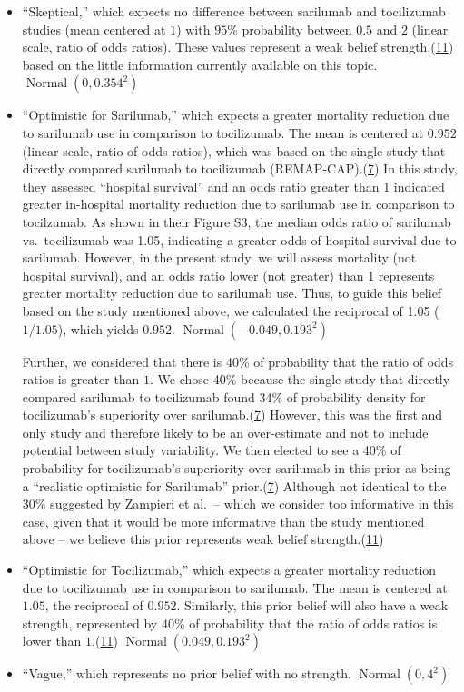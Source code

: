 \documentclass[
  12pt,
]{article}
\begin{document}
\begin{itemize}
\item
  ``Skeptical,'' which expects no difference between sarilumab and
  tocilizumab studies (mean centered at \(1\)) with \(95\%\) probability
  between \(0.5\) and \(2\) (linear scale, ratio of odds ratios). These
  values represent a weak belief
  strength,(\protect\hyperlink{ref-zampieri2021}{11}) based on the
  little information currently available on this topic.
  \(\operatorname{Normal}(0, 0.354^2)\)
\item
  ``Optimistic for Sarilumab,'' which expects a greater mortality
  reduction due to sarilumab use in comparison to tocilizumab. The mean
  is centered at \(0.952\) (linear scale, ratio of odds ratios), which
  was based on the single study that directly compared sarilumab to
  tocilizumab (REMAP-CAP).(\protect\hyperlink{ref-zotero-3144}{7}) In
  this study, they assessed ``hospital survival'' and an odds ratio
  greater than 1 indicated greater in-hospital mortality reduction due
  to sarilumab use in comparison to tocilzumab. As shown in their Figure
  S3, the median odds ratio of sarilumab vs.~tocilizumab was 1.05,
  indicating a greater odds of hospital survival due to sarilumab.
  However, in the present study, we will assess mortality (not hospital
  survival), and an odds ratio lower (not greater) than 1 represents
  greater mortality reduction due to sarilumab use. Thus, to guide this
  belief based on the study mentioned above, we calculated the
  reciprocal of 1.05 (\(1/1.05\)), which yields \(0.952\).
  \(\operatorname{Normal}(-0.049, 0.193^2)\)

  Further, we considered that there is 40\% of probability that the
  ratio of odds ratios is greater than \(1\). We chose 40\% because the
  single study that directly compared sarilumab to tocilizumab found
  34\% of probability density for tocilizumab's superiority over
  sarilumab.(\protect\hyperlink{ref-zotero-3144}{7}) However, this was
  the first and only study and therefore likely to be an over-estimate
  and not to include potential between study variability. We then
  elected to see a 40\% of probability for tocilizumab's superiority
  over sarilumab in this prior as being a ``realistic optimistic for
  Sarilumab'' prior.(\protect\hyperlink{ref-zotero-3144}{7}) Although
  not identical to the 30\% suggested by Zampieri et al.~-- which we
  consider too informative in this case, given that it would be more
  informative than the study mentioned above -- we believe this prior
  represents weak belief
  strength.(\protect\hyperlink{ref-zampieri2021}{11})
\item
  ``Optimistic for Tocilizumab,'' which expects a greater mortality
  reduction due to tocilizumab use in comparison to sarilumab. The mean
  is centered at \(1.05\), the reciprocal of \(0.952\). Similarly, this
  prior belief will also have a weak strength, represented by 40\% of
  probability that the ratio of odds ratios is lower than
  \(1\).(\protect\hyperlink{ref-zampieri2021}{11})
  \(\operatorname{Normal}(0.049, 0.193^2)\)
\item
  ``Vague,'' which represents no prior belief with no strength.
  \(\operatorname{Normal}(0, 4^2)\)
\end{itemize}
\end{document}
